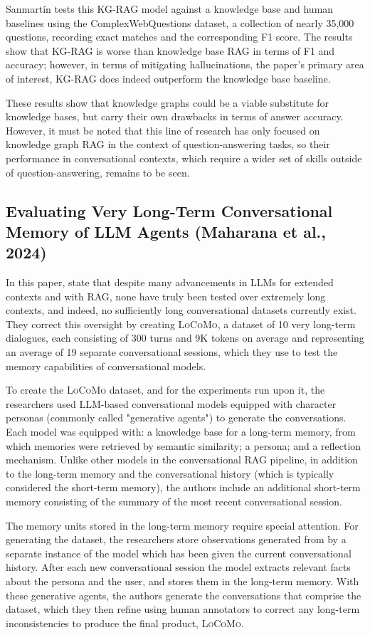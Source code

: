Sanmartín tests this KG-RAG model against a knowledge base and human baselines using the ComplexWebQuestions dataset, a collection of nearly 35,000 questions, recording exact matches and the corresponding F1 score. The results show that KG-RAG is worse than knowledge base RAG in terms of F1 and accuracy; however, in terms of mitigating hallucinations, the paper's primary area of interest, KG-RAG does indeed outperform the knowledge base baseline.
	
These results show that knowledge graphs could be a viable substitute for knowledge bases, but carry their own drawbacks in terms of answer accuracy. However, it must be noted that this line of research has only focused on knowledge graph RAG in the context of question-answering tasks, so their performance in conversational contexts, which require a wider set of skills outside of question-answering, remains to be seen.


\subsection{Evaluating Very Long-Term Conversational Memory of LLM Agents (Maharana et al., 2024)}

In this paper, \cite{Maharana2024} state that despite many advancements in LLMs for extended contexts and with RAG, none have truly been tested over extremely long contexts, and indeed, no sufficiently long conversational datasets currently exist. They correct this oversight by creating \textsc{LoCoMo}, a dataset of 10 very long-term dialogues, each consisting of 300 turns and 9K tokens on average and representing an average of 19 separate conversational sessions, which they use to test the memory capabilities of conversational models.

To create the \textsc{LoCoMo} dataset, and for the experiments run upon it, the researchers used LLM-based conversational models equipped with character personas (commonly called "generative agents") to generate  the conversations. Each model was equipped with: a knowledge base for a long-term memory, from which memories were retrieved by semantic similarity; a persona; and a reflection mechanism. Unlike other models in the conversational RAG pipeline, in addition to the long-term memory and the conversational history (which is typically considered the short-term memory), the authors include an additional short-term memory consisting of the summary of the most recent conversational session. 
	
The memory units stored in the long-term memory require special attention. For generating the dataset, the researchers store observations generated from by a separate instance of the model which has been given the current conversational history. After each new conversational session the model extracts relevant facts about the persona and the user, and stores them in the long-term memory. With these generative agents, the authors generate the conversations that comprise the dataset, which they then refine using human annotators to correct any long-term inconsistencies to produce the final product, \textsc{LoCoMo}. 
	
